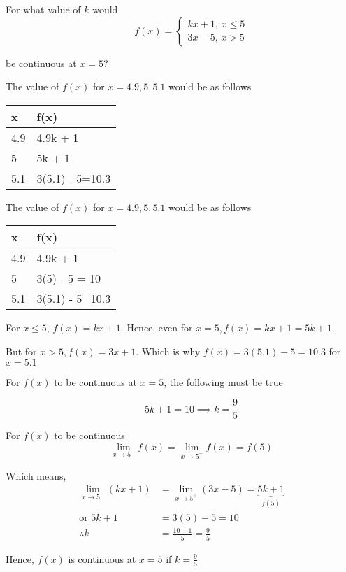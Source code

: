 \documentclass[14pt,fleqn]{extarticle}
\begin{document}
For what value of $k$ would 
%
\[ \qquad f(x) = \begin{cases}
kx + 1,\, x\leq 5 \\ 
3x-5,\, x> 5 
\end{cases} \]

be continuous at $x=5$? 
% 

\newcard

The value of $f(x)$ for $x = 4.9,5,5.1$ 
would be as follows\newline  

%
\begin{center}
\begin{tabular}{MM}
\midrule 
x & f(x) \\ 
 & 4.9k + 1 \\ 
 & 5k + 1 \\ 
 & 3(5.1) - 5=10.3 \\ 
\midrule 
\end{tabular} 
\end{center} 

\newcard

The value of $f(x)$ for $x = 4.9,5,5.1$ 
would be as follows\newline 

%
\begin{center}
\begin{tabular}{MM}
\toprule
x & f(x) \\ 
 & 4.9k + 1 \\ 
 & 3(5) - 5 = 10 \\ 
 & 3(5.1) - 5=10.3 \\ 
\bottomrule 
\end{tabular} 
\end{center} 

\newcard

For $x\leq 5$, $f(x) = kx + 1$. Hence, even 
for $x=5, f(x) = kx + 1 = 5k+1$ \newline 

But for $x> 5, f(x) = 3x + 1$. 
Which  is why $f(x) = 3(5.1) - 5 = 10.3$
for $x = 5.1$
%

\newcard

For $f(x)$ to be continuous at
$x = 5$, the following must be true

\[ \qquad 5k + 1 = 10 \implies k = \frac{9}{5} \] 
%

\newcard

For $f(x)$ to be continuous 
\[ \qquad \lim_{x\to 5^-}f(x) = \lim_{x\to 5^+} f(x) = f(5) \]

Which means, 
%
\begin{align}
\lim_{x\to 5^-} (kx+1) &= \lim_{x\to 5^+} (3x-5) = \underbrace{5k+1}_{f(5)}\\
\text{or } 5k + 1 &= 3(5) - 5 = 10 \\
\therefore k &= \frac{10 - 1}{5} = \frac{9}{5}
\end{align}

Hence, $f(x)$ is continuous at $x=5$
if $k = \frac{9}{5}$
%
\end{document}
